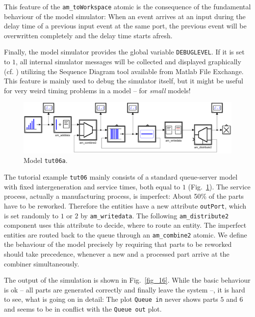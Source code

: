 \documentclass[12pt,oneside,a4paper,bibtotoc,BCOR=0pt,DIV=20]{scrreprt}
\newcommand{\cft}[1]{\mbox{\texttt{#1}}}   %
\begin{document}
This feature of the \cft{am\_toWorkspace} atomic is the consequence of the
fundamental behaviour of the model simulator: When an event arrives at an input
during the delay time of a previous input event at the same port, the previous
event will be overwritten completely and the delay time starts afresh. 
  
Finally, the model simulator provides the global variable \cft{DEBUGLEVEL}. If
it is set to $1$, all internal simulator messages will be collected and
displayed graphically (cf. \cite{nsaSimulator2}) utilizing the Sequence Diagram
tool available from Matlab File Exchange. This feature is mainly used to debug
the simulator itself, but it might be useful for very weird timing problems in
a model -- for \emph{small} models! \\

\begin{figure}[ht]
\centering
\includegraphics[width=0.88\columnwidth]{images/bild15.pdf}
\caption{Model \cft{tut06a}.}
\label{fig_15}
\end{figure}

The tutorial example \cft{tut06} mainly consists of a standard queue-server
model with fixed intergeneration and service times, both equal to $1$
(Fig.\ \ref{fig_15}). The service process, actually a manufacturing process, is
imperfect: About 50\% of the parts have to be reworked. Therefore the entities
have a new attribute \cft{outPort}, which is set randomly to $1$ or $2$ by
\cft{am\_writedata}. The following \cft{am\_distribute2} component uses this
attribute to decide, where to route an entity. The imperfect entities are
routed back to the queue through an \cft{am\_combine2} atomic. We define the
behaviour of the model precisely by requiring that parts to be reworked should
take precedence, whenever a new and a processed part arrive at the combiner
simultaneously.

The output of the simulation is shown in Fig.\ \ref{fig_16}. While the basic
behaviour is ok -- all parts are generated correctly and finally leave the
system --, it is hard to see, what is going on in detail: The plot \cft{Queue
  in} never shows parts $5$ and $6$ and seems to be in conflict with the
\cft{Queue out} plot.
\end{document}
